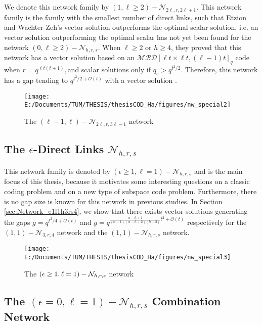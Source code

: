 We denote this network family by $(1,\ell\geq2)-\mathcal{N}_{2\ell,r,2\ell+1}$.
This network family is the family with the smallest number of direct
links, such that Etzion and Wachter-Zeh's vector solution outperforms
the optimal scalar solution, i.e. an vector solution outperforming
the optimal scalar has not yet been found for the network $(0,\ell\geq2)-\mathcal{N}_{h,r,s}$.
When $\ell\geq2$ or $h\geq4$, they proved that this network has
a vector solution based on an $\mathcal{MRD}\left[\ell t\times\ell t,(\ell-1)t\right]_{q}$
code when $r=q^{\ell t\left(t+1\right)},$and scalar solutions only
if $q_{s}>q^{t^{2}/2}$. Therefore, this network has a gap tending
to $q^{t^{2}/2+\mathcal{O}\left(t\right)}$ with a vector solution
.
\begin{figure}[H]
\caption{The $\left(\ell-1,\ell\right)-\mathcal{N}_{2\ell,r,3\ell-1}$ network
\label{fig:network_special2}}

\centering{}\texttt{[image: E:/Documents/TUM/THESIS/thesisCOD\_Ha/figures/nw\_special2]}
\end{figure}


\subsection{The $\epsilon$-Direct Links $\mathcal{N}_{h,r,s}$}

This network family is denoted by $\left(\epsilon\geq1,\ell=1\right)-\mathcal{N}_{h,r,s}$
and is the main focus of this thesis, because it motivates some interesting
questions on a classic coding problem and on a new type of subspace
code problem. Furthermore, there is no gap size is known for this
network in previous studies. In Section \ref{sec:Network_e1l1h3rs4},
we show that there exists vector solutions generating the gaps $g=q^{t^{2}/4+\mathcal{O}(t)}$
and $g=q^{\frac{\alpha-h+1}{\left(\alpha-1\right)\left(\alpha-h+2\right)\left(h-2\right)}t^{2}+\mathcal{O}(t)}$
respectively for the $\left(1,1\right)-\mathcal{N}_{3,r,4}$ network
and the $\left(1,1\right)-\mathcal{N}_{h,r,s}$ network. 
\begin{figure}[H]
\caption{The $\left(\epsilon\protect\geq1,\ell=1\right)-\mathcal{N}_{h,r,s}$
network \label{fig:network_special3}}

\centering{}\texttt{[image: E:/Documents/TUM/THESIS/thesisCOD\_Ha/figures/nw\_special3]}
\end{figure}


\subsection{The $\left(\epsilon=0,\ell=1\right)-\mathcal{N}_{h,r,s}$ Combination
Network}

